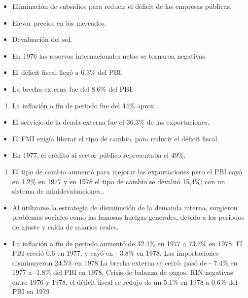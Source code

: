 \documentclass[
  jou,
  floatsintext,
  longtable,
  a4paper,
  nolmodern,
  notxfonts,
  notimes,
  colorlinks=true,linkcolor=blue,citecolor=blue,urlcolor=blue]{apa7}
\providecommand{\tightlist}{%
  \setlength{\itemsep}{0pt}\setlength{\parskip}{0pt}}
\begin{document}
\begin{itemize}
\tightlist
\item
  Eliminación de subsidios para reducir el déficit de las empresas
  públicas.
\item
  Elevar precios en los mercados.
\item
  Devaluación del sol.
\item
  En 1976 las reservas internacionales netas se tornaron negativas.
\item
  El déficit fiscal llegó a 6.3\% del PBI.
\item
  La brecha externa fue del 8.6\% del PBI.
\end{itemize}

\begin{enumerate}
\def\labelenumi{\arabic{enumi}.}
\setcounter{enumi}{3}
\tightlist
\item
  La inflación a fin de periodo fue del 44\% aprox.
\end{enumerate}

\begin{itemize}
\tightlist
\item
  El servicio de la deuda externa fue el 36.3\% de las exportaciones.
\item
  El FMI exigía liberar el tipo de cambio, para reducir el déficit
  fiscal.
\item
  En 1977, el crédito al sector público representaba el 49\%.
\end{itemize}

\begin{enumerate}
\def\labelenumi{\arabic{enumi}.}
\setcounter{enumi}{4}
\tightlist
\item
  El tipo de cambio aumentó para mejorar las exportaciones pero el PBI
  cayó en 1.2\% en 1977 y en 1978 el tipo de cambio se devaluó 15,4\%;
  con un sistema de minidevaluaciones..
\end{enumerate}

\begin{itemize}
\tightlist
\item
  Al utilizarse la estrategia de disminución de la demanda interna,
  surgieron problemas sociales como las famosas huelgas generales,
  debido a los periodos de ajuste y caída de salarios reales.
\item
  La inflación a fin de periodo aumentó de 32.4\% en 1977 a 73.7\% en
  1978. El PBI creció 0.6 en 1977, y cayó en - 3.8\% en 1978. Las
  importaciones disminuyeron 24.5\% en 1978.La brecha externa se cerró:
  pasó de - 7.4\% en 1977 a -1.8\% del PBI en 1978. Crisis de balanza de
  pagos, RIN negativas entre 1976 y 1978, el déficit fiscal se redujo de
  un 5.1\% en 1978 a 0.6\% del PBI en 1979
\end{itemize}
\end{document}
